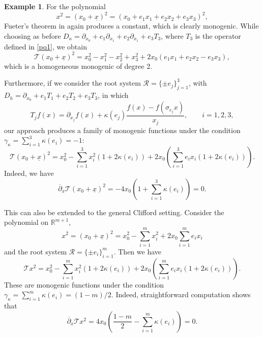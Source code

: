 \documentclass{amsart}
\theoremstyle{definition}
\newtheorem{ex}[theorem]{Example}
\theoremstyle{remark}
\numberwithin{equation}{section}
\begin{document}
  \begin{ex} For the polynomial \begin{equation*}
     x^{2}=(x_{0}+\underline{x})^{2}=(x_{0}+e_{1}x_{1}+e_{2}x_{2}+e_{3}x_{3})^{2},
  \end{equation*} Fueter's theorem in \cite{sce} again produces a constant, which is clearly monogenic. While choosing as before $D_{\kappa}=\partial_{x_{0}}+e_{1}\partial_{x_{1}}+e_{2}\partial_{x_{1}}+e_{3}T_{3}$, where $T_{3}$ is the operator defined in \eqref{pq1},  we obtain
  \begin{equation*}
       \mathcal{T}(x_{0}+\underline{x})^2=x_0^2-x_1^2-x_2^2+x_3^2+2x_0(e_1x_1+e_2x_2-e_3x_3),
  \end{equation*}
      which is a homogeneous monogenic of degree 2.

      Furthermore, if we  consider the root system $\mathscr{R}=\{\pm e_j\}_{j=1}^3$, with $D_{h}=\partial_{x_{0}}+e_{1}T_{1}+e_{2}T_2+e_{3}T_{3}$, in which
 \begin{equation*}
     T_{j}f(x)=\partial_{x_{j}}f(x)+\kappa(e_j)\frac{f(x)-f(\sigma_{e_j}x)}{x_{j}},  \qquad i=1,2,3,
 \end{equation*} our approach  produces a family of monogenic functions under the condition $\gamma_\kappa=\sum_{i=1}^3\kappa (e_i)=-1$:
 \begin{equation*}
      \mathcal{T}(x_{0}+\underline{x})^2=x_0^2-\sum_{i=1}^3x_i^2(1+2\kappa(e_i))+2x_0\left(\sum_{i=1}^3e_ix_i(1+2\kappa (e_i))\right).
 \end{equation*}
 Indeed, we have
 \begin{equation*}
\overline{\partial}_{x} \mathcal{T}(x_{0}+\underline{x})^2=-4x_0\left(1+\sum_{i=1}^3\kappa(e_i)\right)=0.
 \end{equation*}


 This can also be extended to the general Clifford setting.  Consider the polynomial on $\mathbb{R}^{m+1}$, \begin{equation*}
     x^{2}=(x_{0}+\underline{x})^2=x_0^2-\sum_{i=1}^mx_i^2+2x_0\sum_{i=1}^m e_ix_i
 \end{equation*} and the root system $\mathscr{R}=\{\pm e_i\}_{i=1}^m$. Then we have
 \begin{equation*}
     \mathcal{T}x^{2}=x_0^2-\sum_{i=1}^m x_i^2(1+2\kappa(e_i))+2x_0\left(\sum_{i=1}^me_ix_i(1+2\kappa(e_i))\right).
 \end{equation*}
 These are monogenic functions under the condition $\gamma_\kappa=\sum_{i=1}^{m}\kappa(e_i)=(1-m)/2$. Indeed, straightforward computation shows that
 \begin{equation*}
     \overline{\partial}_{x}\mathcal{T}x^{2}=4x_0\left(\frac{1-m}{2}-\sum_{i=1}^m\kappa(e_i)\right)=0.
 \end{equation*}
  \end{ex}
\end{document}
